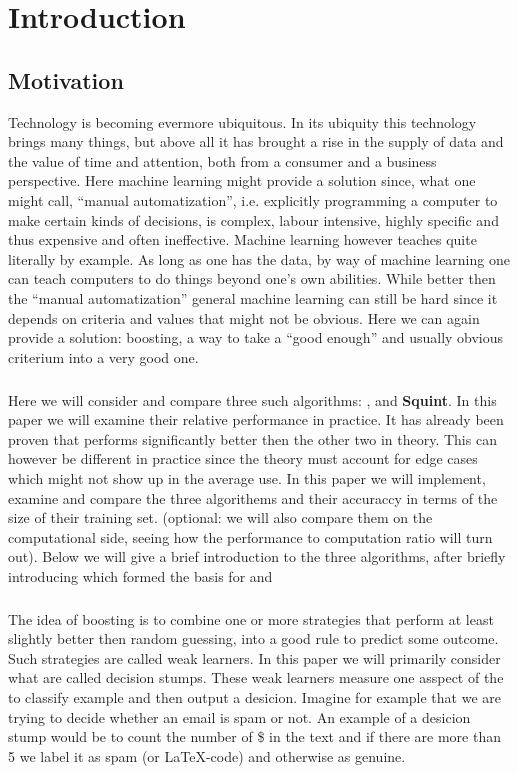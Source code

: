 
\chapter{Introduction}
\label{chap:intro}
\section*{Motivation}
\label{sec:motiv}

Technology is becoming evermore ubiquitous. In its ubiquity this technology brings many things, but above all it has brought a rise in the supply of data and the value of time and attention, both from a consumer and a business perspective. Here machine learning might provide a solution since, what one might call, ``manual automatization'', i.e. explicitly programming a computer to make certain kinds of decisions, is complex, labour intensive, highly specific and thus expensive and often ineffective. Machine learning however teaches quite literally by example. As long as one has the data, by way of machine learning one can teach computers to do things beyond one's own abilities. While better then the ``manual automatization'' general machine learning can still be hard since it depends on criteria and values that might not be obvious. Here we can again provide a solution: boosting, a way to take a ``good enough'' and usually obvious criterium into a very good one.

\paragraph*{} Here we will consider and compare three such algorithms: \adaB, \adaN and \textbf{Squint}. In this paper we will examine their relative performance in practice. It has already been proven that \squint performs significantly better then the other two in theory. This can however be different in practice since the theory must account for edge cases which might not show up in the average use. In this paper we will implement, examine and compare the three algorithems and their accuraccy in terms of the size of their training set. (optional: we will also compare them on the computational side, seeing how the performance to computation ratio will turn out). Below we will give a brief introduction to the three algorithms, after briefly introducing \hedge which formed the basis for \adaB and \adaN

\subsection*{\weak}
The idea of boosting is to combine one or more strategies that perform at least slightly better then random guessing, into a good rule to predict some outcome. Such strategies are called weak learners. In this paper we will primarily consider what are called decision stumps. These weak learners measure one asspect of the to classify example and then output a desicion. Imagine for example that we are trying to decide whether an email is spam or not. An example of a desicion stump would be to count the number of \$ in the text and if there are more than 5 we label it as spam (or \LaTeX-code) and otherwise as genuine. 

